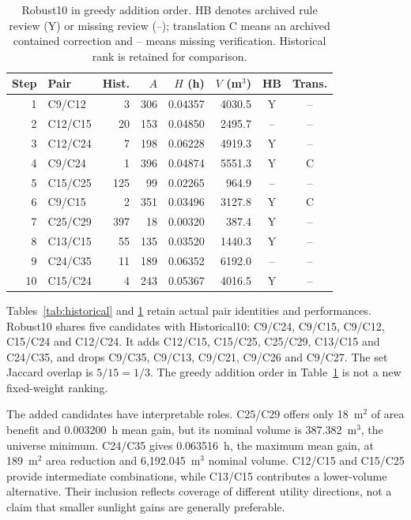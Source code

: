 \documentclass{llncs}
\begin{document}
\begin{table}[tbp]\caption{Robust10 in greedy addition order. HB denotes archived rule review (Y) or missing review (--); translation C means an archived contained correction and -- means missing verification. Historical rank is retained for comparison.}\label{tab:robust}\centering
\small
\begin{tabular}{rlrrrrcc}\toprule
Step & Pair & Hist. & $A$ & $H$ (h) & $V$ (m$^3$) & HB & Trans.\\\midrule
1 & C9/C12 & 3 & 306 & 0.04357 & 4030.5 & Y & --\\
2 & C12/C15 & 20 & 153 & 0.04850 & 2495.7 & -- & --\\
3 & C12/C24 & 7 & 198 & 0.06228 & 4919.3 & Y & --\\
4 & C9/C24 & 1 & 396 & 0.04874 & 5551.3 & Y & C\\
5 & C15/C25 & 125 & 99 & 0.02265 & 964.9 & -- & --\\
6 & C9/C15 & 2 & 351 & 0.03496 & 3127.8 & Y & C\\
7 & C25/C29 & 397 & 18 & 0.00320 & 387.4 & Y & --\\
8 & C13/C15 & 55 & 135 & 0.03520 & 1440.3 & Y & --\\
9 & C24/C35 & 11 & 189 & 0.06352 & 6192.0 & -- & --\\
10 & C15/C24 & 4 & 243 & 0.05367 & 4016.5 & Y & --\\
\bottomrule\end{tabular}

\end{table}



Tables~\ref{tab:historical} and \ref{tab:robust} retain actual pair identities and performances. Robust10 shares five candidates with Historical10: C9/C24, C9/C15, C9/C12, C15/C24 and C12/C24. It adds C12/C15, C15/C25, C25/C29, C13/C15 and C24/C35, and drops C9/C35, C9/C13, C9/C21, C9/C26 and C9/C27. The set Jaccard overlap is $5/15=1/3$. The greedy addition order in Table~\ref{tab:robust} is not a new fixed-weight ranking.

The added candidates have interpretable roles. C25/C29 offers only 18~m$^2$ of area benefit and 0.003200~h mean gain, but its nominal volume is 387.382~m$^3$, the universe minimum. C24/C35 gives 0.063516~h, the maximum mean gain, at 189~m$^2$ area reduction and 6,192.045~m$^3$ nominal volume. C12/C15 and C15/C25 provide intermediate combinations, while C13/C15 contributes a lower-volume alternative. Their inclusion reflects coverage of different utility directions, not a claim that smaller sunlight gains are generally preferable.
\end{document}
